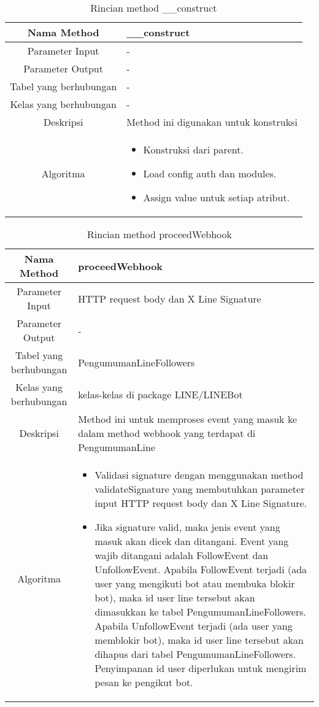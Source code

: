 \begin{center}
	\begin{table}[H]
	\caption{Rincian method \_\_construct}
	\label{table:pengumuman-line-model-construct}
\begin{tabular}{|c|p{11cm}|}
\hline
Nama Method 	& 	 	\_\_construct \\
\hline
Parameter Input & - \\
\hline
Parameter Output & - \\
\hline
Tabel yang berhubungan & -\\
\hline
Kelas yang berhubungan &  - \\
\hline
Deskripsi	& Method ini digunakan untuk konstruksi\\
\hline
Algoritma	& \begin{itemize}
				\item Konstruksi dari parent.
				\item Load config auth dan modules.
				\item Assign value untuk setiap atribut.
				\end{itemize} \\
\hline
\end{tabular}
\end{table}
\end{center}

\begin{center}
	\begin{table}[H]
	\caption{Rincian method proceedWebhook}
	\label{table:pengumuman-line-model-proceedwebhook}
\begin{tabular}{|c|p{11cm}|}
\hline
Nama Method 	& 	 proceedWebhook	\\
\hline
Parameter Input & HTTP request body dan X Line Signature \\
\hline
Parameter Output & - \\
\hline
Tabel yang berhubungan & PengumumanLineFollowers\\
\hline
Kelas yang berhubungan & kelas-kelas di package LINE/LINEBot \\
\hline
Deskripsi	& Method ini untuk memproses event yang masuk ke dalam method webhook yang terdapat di PengumumanLine\\
\hline
Algoritma	& \begin{itemize}
				\item Validasi signature dengan menggunakan method validateSignature yang membutuhkan parameter input HTTP request body dan X Line Signature.
				\item Jika signature valid, maka jenis event yang masuk akan dicek dan ditangani. Event yang wajib ditangani adalah FollowEvent dan UnfollowEvent. Apabila FollowEvent terjadi (ada user yang mengikuti bot atau membuka blokir bot), maka id user line tersebut akan dimasukkan ke tabel PengumumanLineFollowers. Apabila UnfollowEvent terjadi (ada user yang memblokir bot), maka id user line tersebut akan dihapus dari tabel PengumumanLineFollowers. Penyimpanan id user diperlukan untuk mengirim pesan ke pengikut bot.
				\end{itemize} \\
\hline
\end{tabular}
\end{table}
\end{center}

